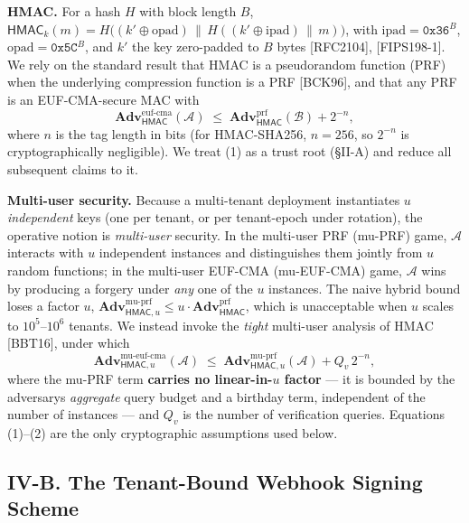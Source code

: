 \textbf{HMAC.} For a hash \(H\) with block length \(B\),
\(\mathsf{HMAC}_k(m)=H\big((k'\oplus\mathrm{opad})\,\|\,
H((k'\oplus\mathrm{ipad})\,\|\,m)\big)\), with
\(\mathrm{ipad}=\texttt{0x36}^B\), \(\mathrm{opad}=\texttt{0x5C}^B\),
and \(k'\) the key zero-padded to \(B\) bytes {[}RFC2104{]},
{[}FIPS198-1{]}. We rely on the standard result that HMAC is a
pseudorandom function (PRF) when the underlying compression function is
a PRF {[}BCK96{]}, and that any PRF is an EUF-CMA-secure MAC with
\[\mathbf{Adv}^{\text{euf-cma}}_{\mathsf{HMAC}}(\mathcal{A}) \;\le\;
\mathbf{Adv}^{\text{prf}}_{\mathsf{HMAC}}(\mathcal{B}) + 2^{-n},\tag{1}\]
where \(n\) is the tag length in bits (for HMAC-SHA256, \(n=256\), so
\(2^{-n}\) is cryptographically negligible). We treat (1) as a trust
root (§II-A) and reduce all subsequent claims to it.

\textbf{Multi-user security.} Because a multi-tenant deployment
instantiates \(u\) \emph{independent} keys (one per tenant, or per
tenant-epoch under rotation), the operative notion is \emph{multi-user}
security. In the multi-user PRF (mu-PRF) game, \(\mathcal{A}\) interacts
with \(u\) independent instances and distinguishes them jointly from
\(u\) random functions; in the multi-user EUF-CMA (mu-EUF-CMA) game,
\(\mathcal{A}\) wins by producing a forgery under \emph{any} one of the
\(u\) instances. The naive hybrid bound loses a factor \(u\),
\(\mathbf{Adv}^{\text{mu-prf}}_{\mathsf{HMAC},u}\le u\cdot\mathbf{Adv}^{\text{prf}}_{\mathsf{HMAC}}\),
which is unacceptable when \(u\) scales to \(10^5\)--\(10^6\) tenants.
We instead invoke the \emph{tight} multi-user analysis of HMAC
{[}BBT16{]}, under which
\[\mathbf{Adv}^{\text{mu-euf-cma}}_{\mathsf{HMAC},u}(\mathcal{A})\;\le\;
\mathbf{Adv}^{\text{mu-prf}}_{\mathsf{HMAC},u}(\mathcal{A})+Q_v\,2^{-n},\tag{2}\]
where the mu-PRF term \textbf{carries no linear-in-\(u\) factor} --- it
is bounded by the adversary\textquotesingle s \emph{aggregate} query
budget and a birthday term, independent of the number of instances ---
and \(Q_v\) is the number of verification queries. Equations (1)--(2)
are the only cryptographic assumptions used below.

\subsection{IV-B. The Tenant-Bound Webhook Signing
Scheme}\label{iv-b-the-tenant-bound-webhook-signing-scheme}

